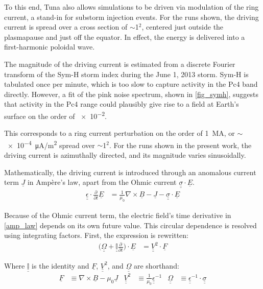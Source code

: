 \documentclass{article}
\newcommand{\about}{\ensuremath{\sim}}
\newcommand{\Ampere}{Amp\`ere\xspace}
\renewcommand{\vec}[1]{\ensuremath{\underline{#1}}}
\newcommand{\tensor}[1]{\ensuremath{\underline{\underline{#1}}}}
\newcommand{\dd}[1]{\ensuremath{ \frac{\partial}{\partial #1} }\xspace}
\newcommand{\ddt}{\dd{t}\xspace}
\newcommand{\curl}[1]{\ensuremath{ \nabla \times \vec{#1} }\xspace}
\newcommand{\mz}{\ensuremath{\mu_0}\xspace}
\newcommand{\oomz}{\ensuremath{ \frac{1}{\mz} }\xspace}
\begin{document}
To this end, Tuna also allows simulations to be driven via modulation of the ring current, a stand-in for substorm injection events. For the runs shown, the driving current is spread over a cross section of \about\SI{1}{\RE}$^2$, centered just outside the plasmapause and just off the equator. In effect, the energy is delivered into a first-harmonic poloidal wave.

The magnitude of the driving current is estimated from a discrete Fourier transform of the Sym-H storm index during the June 1, 2013 storm. Sym-H is tabulated once per minute, which is too slow to capture activity in the Pc4 band directly. However, a fit of the pink noise spectrum, shown in \cref{fig_symh}, suggests that activity in the Pc4 range could plausibly give rise to a field at Earth's surface on the order of \SI{e-2}{\nT}.

This corresponds to a ring current perturbation on the order of \SI{1}{\mega\A}, or \about\SI{e-4}{\uA/\m\squared} spread over \about\SI{1}{\RE}$^2$. For the runs shown in the present work, the driving current is azimuthally directed, and its magnitude varies sinusoidally.


Mathematically, the driving current is introduced through an anomalous current term $\vec{J}$ in \Ampere's law, apart from the Ohmic current ${\tensor{\sigma} \cdot \vec{E}}$.
\begin{align}
    \label{amp_law}
    \tensor{\epsilon} \cdot \ddt \vec{E} &= \oomz \curl{B} - \vec{J}
      - \tensor{\sigma} \cdot \vec{E}
\end{align}

Because of the Ohmic current term, the electric field's time derivative in \cref{amp_law} depends on its own future value. This circular dependence is resolved using integrating factors. First, the expression is rewritten:
\begin{align}
    \label{int_fac}
    \Big( \tensor{\Omega} + \tensor{ \mathbb{I} }\ddt \Big) \cdot
        \vec{E} &= \tensor{V}^2 \cdot \vec{F}
\end{align}

Where $\tensor{ \mathbb{I} }$ is the identity and $\vec{F}$, $\tensor{V}^2$, and $\tensor{\Omega}$ are shorthand:
\begin{align}
    \vec{F} &\equiv \curl{B} - \mz \vec{J} &
    \tensor{V}^2 &\equiv \frac{1}{\mz} \tensor{\epsilon}^{-1} &
    \tensor{\Omega} &\equiv \tensor{\epsilon}^{-1} \cdot \tensor{\sigma}
\end{align}
\end{document}
